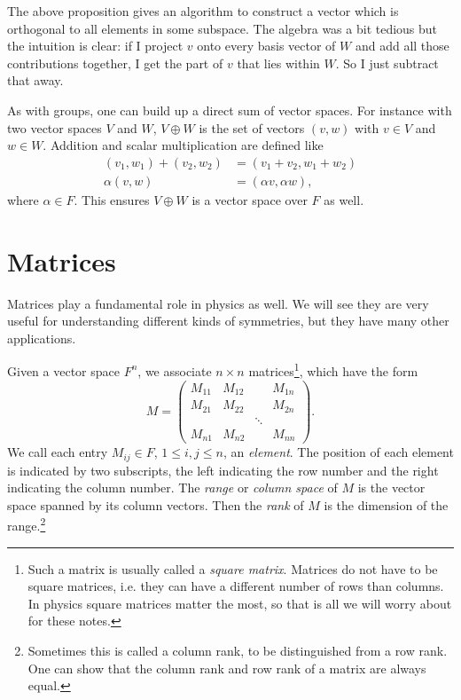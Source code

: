 The above proposition gives an algorithm to construct
a vector which is orthogonal to all elements in some subspace.
The algebra was a bit tedious but the intuition is clear:
if I project $v$ onto every basis vector of $W$ and add all
those contributions together, I get the part of $v$ that lies
within $W$. So I just subtract that away.

As with groups, one can build up a direct sum
of vector spaces. For instance with two vector spaces $V$ and $W$,
$V\oplus W$ is the set of vectors $(v,w)$ with $v\in V$ and $w\in W$.
Addition and scalar multiplication are defined like
\begin{equation}\begin{aligned}
(v_1,w_1)+(v_2,w_2)&=(v_1+v_2,w_1+w_2)\\
\alpha(v,w)&=(\alpha v,\alpha w),
\end{aligned}\end{equation}
where $\alpha\in F$. This ensures $V\oplus W$ is a vector space
over $F$ as well.

\section{Matrices}

Matrices play a fundamental role in physics as well.
We will see they are very useful for understanding different kinds of
symmetries, but they have many other applications.

Given a vector space $F^n$, we associate
$n\times n$ matrices\footnote{Such a matrix is usually called a {\it square
matrix}. Matrices do not have to be square matrices, i.e. they can have a
different number of rows than columns. In physics square
matrices matter the most, so that is all we will worry about for these notes.},
which have the form
\begin{equation}\label{eq:basicMatrix}
  M=\left(\begin{array}{cccc}
          M_{11}   & M_{12} &       & M_{1n}\\
          M_{21}   & M_{22} &       & M_{2n}\\
                   &        & \ddots&       \\
          M_{n1}   & M_{n2} &       & M_{nn}
            \end{array}\right). 
\end{equation}
We call each entry $M_{ij}\in F$, $1\leq i,j\leq n$, an {\it element}. The position
of each element is indicated by two subscripts, the left
indicating the row number and the right indicating the column number.
The {\it range} or {\it column space} of $M$ is the vector space
spanned by its column vectors.
Then the {\it rank} of $M$ is the dimension of the 
range.\footnote{Sometimes this is called a column rank, to be
distinguished from a row rank. One can show that the column rank and row rank of
a matrix are always equal.} 

